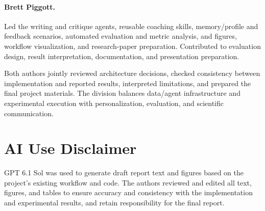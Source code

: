 \documentclass{article}
\begin{document}
\paragraph{Brett Piggott.} Led the writing and critique agents, reusable coaching skills, memory/profile and feedback scenarios, automated evaluation and metric analysis, and figures, workflow visualization, and research-paper preparation. Contributed to evaluation design, result interpretation, documentation, and presentation preparation.

Both authors jointly reviewed architecture decisions, checked consistency between implementation and reported results, interpreted limitations, and prepared the final project materials. The division balances data/agent infrastructure and experimental execution with personalization, evaluation, and scientific communication.

\section{AI Use Disclaimer}\label{sec:ai-use}
GPT 6.1 Sol was used to generate draft report text and figures based on the project's existing workflow and code. The authors reviewed and edited all text, figures, and tables to ensure accuracy and consistency with the implementation and experimental results, and retain responsibility for the final report.
\label{main:last}
\clearpage
\renewcommand{\bibfont}{\small}
\setlength{\bibsep}{0pt}
\label{refs:start}


\clearpage\appendix\onecolumn\raggedbottom
\end{document}

